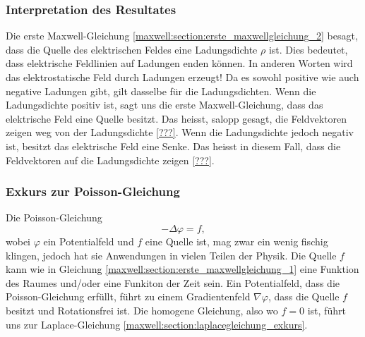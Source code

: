 \subsubsection{Interpretation des Resultates}
Die erste Maxwell-Gleichung \eqref{maxwell:section:erste_maxwellgleichung_2} besagt, dass die Quelle des elektrischen Feldes eine Ladungsdichte $\rho$ ist.
Dies bedeutet, dass elektrische Feldlinien auf Ladungen enden können.
In anderen Worten wird das elektrostatische Feld durch Ladungen erzeugt!
Da es sowohl positive wie auch negative Ladungen gibt, gilt dasselbe für die Ladungsdichten.
Wenn die Ladungsdichte positiv ist, sagt uns die erste Maxwell-Gleichung, dass das elektrische Feld eine Quelle besitzt.
Das heisst, salopp gesagt, die Feldvektoren zeigen weg von der Ladungsdichte \ref{???}.
Wenn die Ladungsdichte jedoch negativ ist, besitzt das elektrische Feld eine Senke.
Das heisst in diesem Fall, dass die Feldvektoren auf die Ladungsdichte zeigen \ref{???}.

\subsubsection{Exkurs zur Poisson-Gleichung}
Die Poisson-Gleichung
\[
-\Delta\varphi
=
f,
\]
wobei $\varphi$ ein Potentialfeld und $f$ eine Quelle ist, mag zwar ein wenig fischig klingen, jedoch hat sie Anwendungen in vielen Teilen der Physik.
Die Quelle $f$ kann wie in Gleichung \eqref{maxwell:section:erste_maxwellgleichung_1} eine Funktion des Raumes und/oder eine Funkiton der Zeit sein.
Ein Potentialfeld, dass die Poisson-Gleichung erfüllt, führt zu einem Gradientenfeld $\nabla\varphi$, dass die Quelle $f$ besitzt und Rotationsfrei ist.
Die homogene Gleichung, also wo $f = 0$ ist, führt uns zur Laplace-Gleichung \ref{maxwell:section:laplacegleichung_exkurs}.







